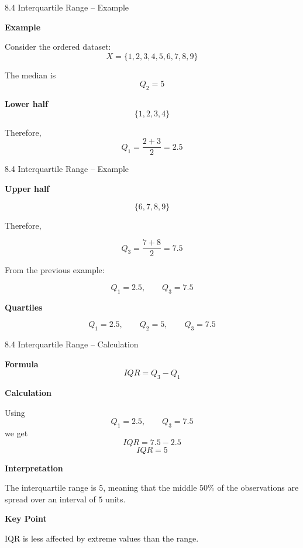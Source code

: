 


\begin{frame}{8.4 Interquartile Range -- Example}

\textbf{Example}

Consider the ordered dataset:
\[
X=\{1,2,3,4,5,6,7,8,9\}
\]

The median is
\[
Q_2=5
\]

\textbf{Lower half}
\[
\{1,2,3,4\}
\]

Therefore,
\[
Q_1
=
\frac{2+3}{2}
=
\boxed{2.5}
\]

\end{frame}



\begin{frame}{8.4 Interquartile Range -- Example}

\textbf{Upper half}

\[
\{6,7,8,9\}
\]

Therefore,

\[
Q_3
=
\frac{7+8}{2}
=
\boxed{7.5}
\]

From the previous example:

\[
Q_1=2.5,
\qquad
Q_3=7.5
\]

\textbf{Quartiles}

\[
Q_1=2.5,
\qquad
Q_2=5,
\qquad
Q_3=7.5
\]

\end{frame}



\begin{frame}{8.4 Interquartile Range -- Calculation}

\textbf{Formula}
\[
\boxed{IQR=Q_3-Q_1}
\]

\textbf{Calculation}

Using
\[
Q_1=2.5,
\qquad
Q_3=7.5
\]
we get
\[
IQR=7.5-2.5
\]
\[
\boxed{IQR=5}
\]

\textbf{Interpretation}

The interquartile range is $5$, meaning that the middle
$50\%$ of the observations are spread over an interval of
$5$ units.

\textbf{Key Point}

IQR is less affected by extreme values than the range.

\end{frame}

